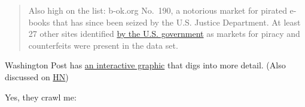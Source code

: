 \documentclass[
  Letterpaper,
]{scrbook}
\begin{document}
\begin{quote}
Also high on the list: b-ok.org No.~190, a notorious market for pirated
e-books that has since been seized by the U.S. Justice Department. At
least 27 other sites identified
\href{https://ustr.gov/sites/default/files/IssueAreas/IP/2021\%20Notorious\%20Markets\%20List.pdf?itid=lk_inline_enhanced-template}{by
the U.S. government} as markets for piracy and counterfeits were present
in the data set.
\end{quote}

Washington Post has
\href{https://www.washingtonpost.com/technology/interactive/2023/ai-chatbot-learning/?utm_source=GeekWire+Newsletters&utm_campaign=e5b7d8b9b6-daily-digest-email&utm_medium=email&utm_term=0_4e93fc7dfd-e5b7d8b9b6-233355689&mc_cid=e5b7d8b9b6}{an
interactive graphic} that digs into more detail. (Also discussed on
\href{https://news.ycombinator.com/item?id=35627102}{HN})

Yes, they crawl me:
\end{document}
